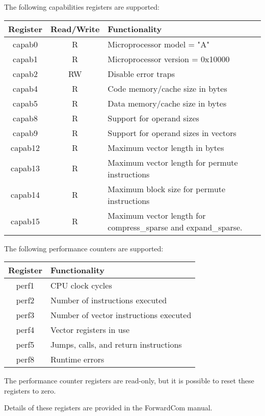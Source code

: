 \documentclass[11pt,a4paper,oneside,openright]{report}
\newcommand{\vv}{ \vspace{2mm} }   %
\begin{document}
The following capabilities registers are supported:
\vv

\begin{tabular}{|c|c|l|} 
\hline
\bfseries Register & \bfseries Read/Write & \bfseries Functionality \\ \hline
capab0 & R   & Microprocessor model = "A" \\ \hline
capab1 & R  & Microprocessor version = 0x10000 \\ \hline
capab2 & RW & Disable error traps \\ \hline
capab4 & R  & Code memory/cache size in bytes \\ \hline
capab5 & R  & Data memory/cache size in bytes \\ \hline

capab8 & R  & Support for operand sizes \\ \hline
capab9 & R  & Support for operand sizes in vectors \\ \hline
capab12 & R & Maximum vector length in bytes \\ \hline
capab13 & R & Maximum vector length for permute instructions \\ \hline
capab14 & R & Maximum block size for permute instructions \\ \hline
capab15 & R & Maximum vector length for compress\_sparse and expand\_sparse. \\ \hline
\end{tabular}
\vv
\vv
\vv

The following performance counters are supported:
\vv

\begin{tabular}{|c|l|} 
\hline
\bfseries Register & \bfseries Functionality \\ \hline
perf1  & CPU clock cycles \\ \hline
perf2  & Number of instructions executed \\ \hline
perf3  & Number of vector instructions executed \\ \hline
perf4  & Vector registers in use \\ \hline
perf5  & Jumps, calls, and return instructions \\ \hline
perf8  & Runtime errors \\ \hline
\hline
\end{tabular}
\vv

The performance counter registers are read-only, but it is possible to reset these registers to zero. 
\vv

Details of these registers are provided in the ForwardCom manual. 
\vv
\end{document}
